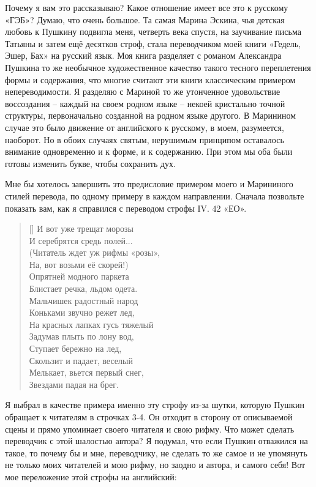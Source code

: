 \documentclass[../main.tex]{subfiles}
\begin{document}
Почему я вам это рассказываю? Какое отношение имеет все это к русскому «ГЭБ»? Думаю, что очень большое. Та самая Марина Эскина, чья детская любовь к Пушкину подвигла меня, четверть века спустя, на заучивание письма Татьяны и затем ещё десятков строф, стала переводчиком моей книги «Гедель, Эшер, Бах» на русский язык. Моя книга разделяет с романом Александра Пушкина то же необычное художественное качество такого тесного переплетения формы и содержания, что многие считают эти книги классическим примером непереводимости. Я разделяю с Мариной то же утонченное удовольствие воссоздания \--- каждый на своем родном языке \--- некоей кристально точной структуры, первоначально созданной на родном языке другого. В Маринином случае это было движение от английского к русскому, в моем, разумеется, наоборот. Но в обоих случаях святым, нерушимым принципом оставалось внимание одновременно и к форме, и к содержанию. При этом мы оба были готовы изменить букве, чтобы сохранить дух.

Мне бы хотелось завершить это предисловие примером моего и Марининого стилей перевода, по одному примеру в каждом направлении. Сначала позвольте показать вам, как я справился с переводом строфы IV. 42 «ЕО».

\settowidth{\versewidth}{Читатель ждет уж рифмы «розы»,}
\begin{verse}[\versewidth]
    И вот уже трещат морозы \\
    И серебрятся средь полей... \\
    (Читатель ждет уж рифмы «розы», \\
    На, вот возьми её скорей!) \\
    Опрятней модного паркета \\
    Блистает речка, льдом одета. \\
    Мальчишек радостный народ \\
    Коньками звучно режет лед, \\
    На красных лапках гусь тяжелый \\
    Задумав плыть по лону вод, \\
    Ступает бережно на лед, \\
    Скользит и падает, веселый \\
    Мелькает, вьется первый снег, \\
    Звездами падая на брег.
\end{verse}

Я выбрал в качестве примера именно эту строфу из-за шутки, которую Пушкин обращает к читателям в строчках 3-4. Он отходит в сторону от описываемой сцены и прямо упоминает своего читателя и свою рифму. Что может сделать переводчик с этой шалостью автора? Я подумал, что если Пушкин отважился на такое, то почему бы и мне, переводчику, не сделать то же самое и не упомянуть не только моих читателей и мою рифму, но заодно и автора, и самого себя! Вот мое переложение этой строфы на английский:
\end{document}
